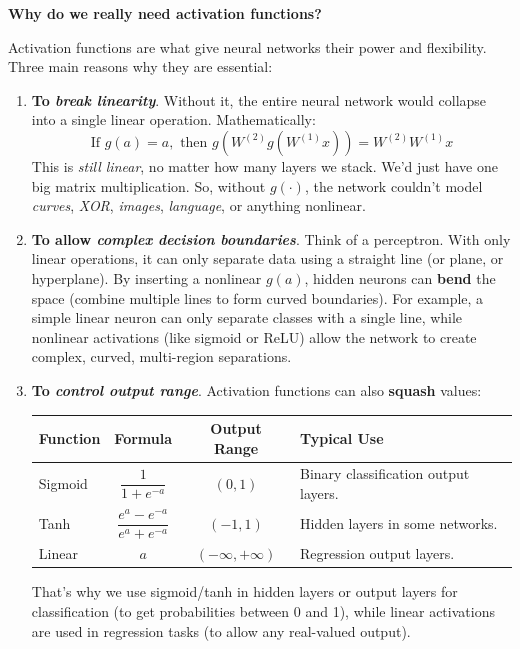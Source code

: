 \highspace
\begin{flushleft}
    \textcolor{Green3}{ \textbf{Why do we really need activation functions?}}
\end{flushleft}
Activation functions are what give neural networks their power and flexibility. Three main reasons why they are essential:
\begin{enumerate}
    \item \textbf{To \emph{break linearity}}. Without it, the entire neural network would collapse into a single linear operation. Mathematically:
    \begin{equation*}
        \text{If } g(a) = a, \text{ then } g(W^{(2)} g(W^{(1)}x)) = W^{(2)}W^{(1)}x
    \end{equation*}
    This is \emph{still linear}, no matter how many layers we stack. We'd just have one big matrix multiplication. So, without $g\left(\cdot\right)$, the network couldn't model \emph{curves}, \emph{XOR}, \emph{images}, \emph{language}, or anything nonlinear.

    \item \textbf{To allow \emph{complex decision boundaries}}. Think of a perceptron. With only linear operations, it can only separate data using a straight line (or plane, or hyperplane). By inserting a nonlinear $g(a)$, hidden neurons can \textbf{bend} the space (combine multiple lines to form curved boundaries). For example, a simple linear neuron can only separate classes with a single line, while nonlinear activations (like sigmoid or ReLU) allow the network to create complex, curved, multi-region separations.

    \item \textbf{To \emph{control output range}}. Activation functions can also \textbf{squash} values:
    \newpage
    \begin{table}[!htp]
        \centering
        \begin{tabular}{@{} l c c l @{}}
            \toprule
            Function & Formula & Output Range & Typical Use \\
            \midrule
            Sigmoid & $\dfrac{1}{1 + e^{-a}}$ & $(0, 1)$ & Binary classification output layers. \\[1.2em]
            Tanh    & $\dfrac{e^{a} - e^{-a}}{e^{a} + e^{-a}}$ & $(-1, 1)$ & Hidden layers in some networks. \\[1.2em]
            Linear  & $a$ & $(-\infty, +\infty)$ & Regression output layers. \\
            \bottomrule
        \end{tabular}
    \end{table}

    That's why we use sigmoid/tanh in hidden layers or output layers for classification (to get probabilities between 0 and 1), while linear activations are used in regression tasks (to allow any real-valued output).
\end{enumerate}

